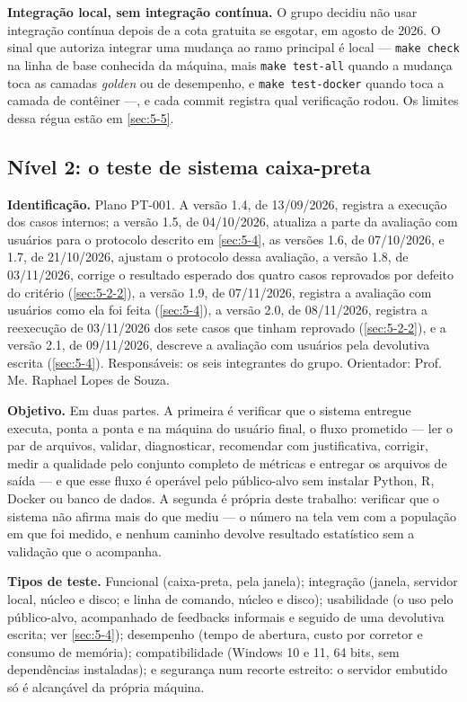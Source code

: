 
\textbf{Integração local, sem integração contínua.} O grupo decidiu não usar integração contínua depois de a cota gratuita se esgotar, em agosto de 2026. O sinal que autoriza integrar uma mudança ao ramo principal é local --- \texttt{make check} na linha de base conhecida da máquina, mais \texttt{make test-\allowbreak{}all} quando a mudança toca as camadas \textit{golden} ou de desempenho, e \texttt{make test-\allowbreak{}docker} quando toca a camada de contêiner ---, e cada commit registra qual verificação rodou. Os limites dessa régua estão em \ref{sec:5-5}.


\subsection{Nível 2: o teste de sistema caixa-preta}\label{sec:5-1-3}

\textbf{Identificação.} Plano PT-001. A versão 1.4, de 13/09/2026, registra a execução dos casos internos; a versão 1.5, de 04/10/2026, atualiza a parte da avaliação com usuários para o protocolo descrito em \ref{sec:5-4}, as versões 1.6, de 07/10/2026, e 1.7, de 21/10/2026, ajustam o protocolo dessa avaliação, a versão 1.8, de 03/11/2026, corrige o resultado esperado dos quatro casos reprovados por defeito do critério (\ref{sec:5-2-2}), a versão 1.9, de 07/11/2026, registra a avaliação com usuários como ela foi feita (\ref{sec:5-4}), a versão 2.0, de 08/11/2026, registra a reexecução de 03/11/2026 dos sete casos que tinham reprovado (\ref{sec:5-2-2}), e a versão 2.1, de 09/11/2026, descreve a avaliação com usuários pela devolutiva escrita (\ref{sec:5-4}). Responsáveis: os seis integrantes do grupo. Orientador: Prof. Me. Raphael Lopes de Souza.

\textbf{Objetivo.} Em duas partes. A primeira é verificar que o sistema entregue executa, ponta a ponta e na máquina do usuário final, o fluxo prometido --- ler o par de arquivos, validar, diagnosticar, recomendar com justificativa, corrigir, medir a qualidade pelo conjunto completo de métricas e entregar os arquivos de saída --- e que esse fluxo é operável pelo público-alvo sem instalar Python, R, Docker ou banco de dados. A segunda é própria deste trabalho: verificar que o sistema não afirma mais do que mediu --- o número na tela vem com a população em que foi medido, e nenhum caminho devolve resultado estatístico sem a validação que o acompanha.

\textbf{Tipos de teste.} Funcional (caixa-preta, pela janela); integração (janela, servidor local, núcleo e disco; e linha de comando, núcleo e disco); usabilidade (o uso pelo público-alvo, acompanhado de feedbacks informais e seguido de uma devolutiva escrita; ver \ref{sec:5-4}); desempenho (tempo de abertura, custo por corretor e consumo de memória); compatibilidade (Windows 10 e 11, 64 bits, sem dependências instaladas); e segurança num recorte estreito: o servidor embutido só é alcançável da própria máquina.

